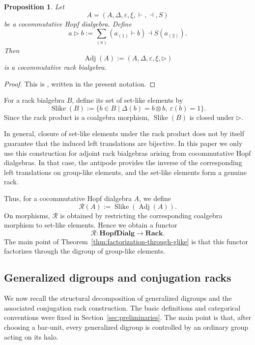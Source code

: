\documentclass[11pt]{article}
\theoremstyle{plain}
\newtheorem{proposition}[theorem]{Proposition}
\theoremstyle{definition}
\theoremstyle{remark}
\DeclareMathOperator{\Slike}{Slike}
\DeclareMathOperator{\Adj}{Adj}
\begin{document}
	\begin{proposition}\label{prop:adjoint-rack-bialgebra}
		Let
		\[
		A=(A,\Delta,\varepsilon,\xi,\vdash,\dashv,S)
		\]
		be a cocommutative Hopf dialgebra. Define
		\[
		a\triangleright b
		:=
		\sum_{(a)}(a_{(1)}\vdash b)\dashv S(a_{(2)}).
		\]
		Then
		\[
		\Adj(A):=(A,\Delta,\varepsilon,\xi,\triangleright)
		\]
		is a cocommutative rack bialgebra.
	\end{proposition}
	
	\begin{proof}
		This is \cite[Proposition~2.6]{ABRW1}, written in the present notation.
	\end{proof}
	
	For a rack bialgebra \(B\), define its set of set-like elements by
	\[
	\Slike(B):=\{b\in B\mid \Delta(b)=b\otimes b,\ \varepsilon(b)=1\}.
	\]
	Since the rack product is a coalgebra morphism, \(\Slike(B)\) is closed under
	\(\triangleright\).
	
	In general, closure of set-like elements under the rack product does not by
	itself guarantee that the induced left translations are bijective. In this
	paper we only use this construction for adjoint rack bialgebras arising from
	cocommutative Hopf dialgebras. In that case, the antipode provides the inverse
	of the corresponding left translations on group-like elements, and the set-like
	elements form a genuine rack.
	
	Thus, for a cocommutative Hopf dialgebra \(A\), we define
	\[
	\mathcal R(A)
	:=
	\Slike(\Adj(A)).
	\]
	On morphisms, \(\mathcal R\) is obtained by restricting the corresponding
	coalgebra morphism to set-like elements. Hence we obtain a functor
	\[
	\mathcal R:
	\mathbf{HopfDialg}
	\longrightarrow
	\mathbf{Rack}.
	\]
	The main point of Theorem~\ref{thm:factorization-through-glike} is that this
	functor factorizes through the digroup of group-like elements.
	
	\subsection{Generalized digroups and conjugation racks}
	
	We now recall the structural decomposition of generalized digroups and the
	associated conjugation rack construction. The basic definitions and categorical
	conventions were fixed in Section~\ref{sec:preliminaries}. The main point is
	that, after choosing a bar-unit, every generalized digroup is controlled by an
	ordinary group acting on its halo.
	
\end{document}
